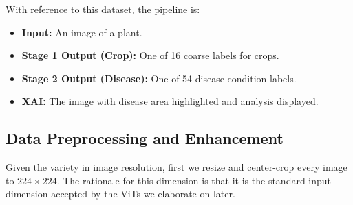 \documentclass[runningheads]{llncs}
\begin{document}
\begin{table}[ht]
\centering
\caption{Image Count per Crop in the Unified Dataset.}
\label{tab:dataset_dist}
\end{table}

With reference to this dataset, the pipeline is:
\begin{itemize}
    \item \textbf{Input:} An image of a plant.
    \item \textbf{Stage 1 Output (Crop):} One of 16 coarse labels for crops.
    \item \textbf{Stage 2 Output (Disease):} One of 54 disease condition labels.
    \item \textbf{XAI:} The image with disease area highlighted and analysis displayed.
\end{itemize}

\subsection{Data Preprocessing and Enhancement}
Given the variety in image resolution, first we resize and center-crop every image to $224 \times 224$. The rationale for this dimension is that it is the standard input dimension accepted by the ViTs we elaborate on later.
\end{document}
